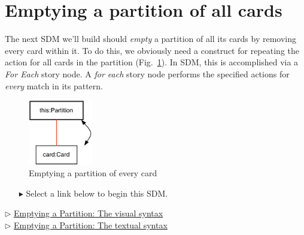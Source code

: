 \newpage
\section{Emptying a partition of all cards}
\genHeader
\hypertarget{sec:emptyPartition}{}

The next SDM we'll build should \emph{empty} a partition of all its cards by removing every card within it. To do this, we obviously need a construct for
repeating the action for all cards in the partition (Fig.~\ref{fig:goal_empty}). In SDM, this is  accomplished via a \emph{For Each} story node.
A \emph{for each} story node performs the specified actions for \emph{every} match in its pattern.

\vspace{0.5cm}

\begin{figure}[htbp]
	\centering
  \includegraphics[width=0.25\textwidth]{empty.pdf}
	\caption{Emptying a partition of every card}
	\label{fig:goal_empty}
\end{figure}
\FloatBarrier

\vspace{0.5cm}
\begin{itemize}
\item[$\blacktriangleright$] Select a link below to begin this SDM.
\end{itemize}

\begin{center} {$\triangleright$ \hyperlink{emptyPartition vis}{Emptying a Partition: The visual syntax}}%
\\ \vspace{0.5cm}
{$\triangleright$ \hyperlink{emptyPartition tex}{Emptying a Partition: The textual syntax} }\end{center} 




